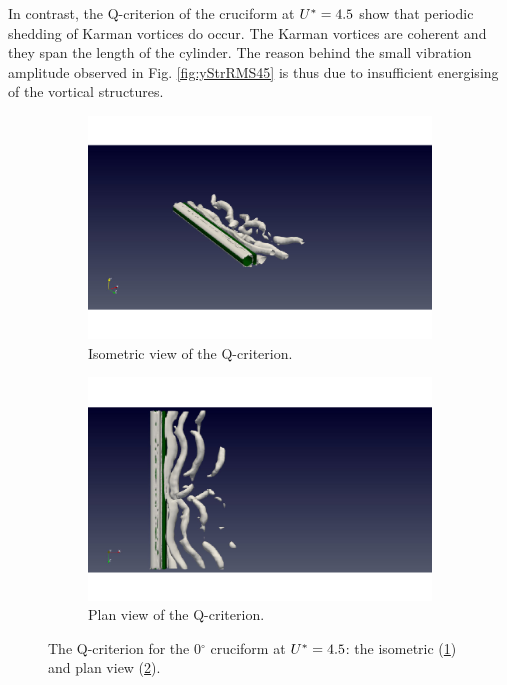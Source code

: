 \documentclass[oneside]{utmthesis}
\begin{document}
In contrast, the Q-criterion of the \angon{} cruciform at $U^{*} = 4.5$ show that periodic shedding of Karman vortices do occur. The Karman vortices are coherent and they span the length of the cylinder. The reason behind the small vibration amplitude observed in Fig. \ref{fig:yStrRMS45} is thus due to insufficient energising of the vortical structures.

\begin{figure}[H]
  \centering
  \begin{subfigure}[h]{0.48\textwidth}
    \includegraphics[width=\textwidth,trim={1.5cm 0 3cm 0},clip]{figs/qIso000U02}
    \caption{Isometric view of the Q-criterion.}
    \label{fig:qIso000U02}
  \end{subfigure}
  \hfill
  \begin{subfigure}[h]{0.48\textwidth}
    \includegraphics[width=\textwidth,trim={1.5cm 0 3cm 0},clip]{figs/qTop000U02}
    \caption{Plan view of the Q-criterion.}
    \label{fig:qTop000U02}
  \end{subfigure}

  \caption{The Q-criterion for the 0$^{\circ}$ cruciform at $U^{*} = 4.5$: the isometric (\ref{fig:qIso000U02}) and plan view (\ref{fig:qTop000U02}).} \label{fig:qCrit000U02}
\end{figure}
\end{document}
